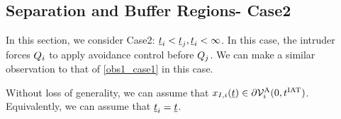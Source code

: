 \subsection{Separation and Buffer Regions- Case2} \label{sec:case2}
In this section, we consider Case2: $\underline{t}_i < \underline{t}_j, \underline{t}_i <\infty$. In this case, the intruder forces $Q_i$ to apply avoidance control before $Q_j$. We can make a similar observation to that of \ref{obs1_case1} in this case.
\begin{observation} \label{obs1_case2}
Without loss of generality, we can assume that $x_{I, i}(\underline{t}) \in \partial \mathcal{V}^{\text{A}}_{i}(0, t^\text{IAT})$. Equivalently, we can assume that $\underline{t}_i = \underline{t}$.
\end{observation}